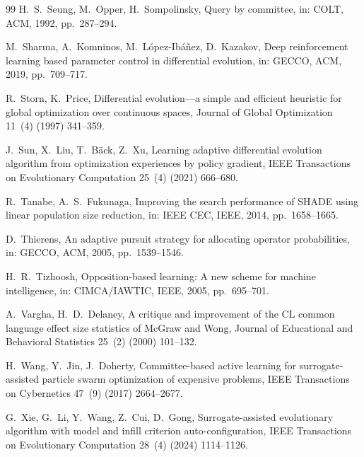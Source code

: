 \documentclass[preprint,12pt,number]{elsarticle}
\begin{document}
\begin{thebibliography}{99}
H.~S.~Seung, M.~Opper, H.~Sompolinsky, Query by committee, in: COLT, ACM, 1992, pp.~287--294.

M.~Sharma, A.~Komninos, M.~L\'opez-Ib\'a\~nez, D.~Kazakov, Deep reinforcement learning based parameter control in differential evolution, in: GECCO, ACM, 2019, pp.~709--717.

R.~Storn, K.~Price, Differential evolution---a simple and efficient heuristic for global optimization over continuous spaces, Journal of Global Optimization 11~(4) (1997) 341--359.

J.~Sun, X.~Liu, T.~B\"ack, Z.~Xu, Learning adaptive differential evolution algorithm from optimization experiences by policy gradient, IEEE Transactions on Evolutionary Computation 25~(4) (2021) 666--680.

R.~Tanabe, A.~S.~Fukunaga, Improving the search performance of SHADE using linear population size reduction, in: IEEE CEC, IEEE, 2014, pp.~1658--1665.

D.~Thierens, An adaptive pursuit strategy for allocating operator probabilities, in: GECCO, ACM, 2005, pp.~1539--1546.

H.~R.~Tizhoosh, Opposition-based learning: A new scheme for machine intelligence, in: CIMCA/IAWTIC, IEEE, 2005, pp.~695--701.

A.~Vargha, H.~D.~Delaney, A critique and improvement of the CL common language effect size statistics of McGraw and Wong, Journal of Educational and Behavioral Statistics 25~(2) (2000) 101--132.

H.~Wang, Y.~Jin, J.~Doherty, Committee-based active learning for surrogate-assisted particle swarm optimization of expensive problems, IEEE Transactions on Cybernetics 47~(9) (2017) 2664--2677.

G.~Xie, G.~Li, Y.~Wang, Z.~Cui, D.~Gong, Surrogate-assisted evolutionary algorithm with model and infill criterion auto-configuration, IEEE Transactions on Evolutionary Computation 28~(4) (2024) 1114--1126.

\end{thebibliography}
\end{document}
